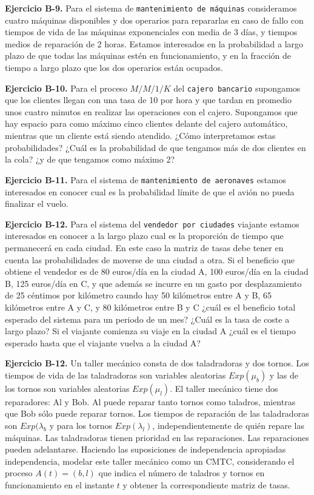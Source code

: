 \documentclass[
]{book}
\theoremstyle{definition}
\theoremstyle{definition}
\theoremstyle{definition}
\theoremstyle{definition}
\theoremstyle{remark}
\begin{document}
\textbf{Ejercicio B-9.} Para el sistema de \texttt{mantenimiento\ de\ máquinas} consideramos cuatro máquinas disponibles y dos operarios para repararlas en caso de fallo con tiempos de vida de las máquinas exponenciales con media de 3 días, y tiempos medios de reparación de 2 horas. Estamos interesados en la probabilidad a largo plazo de que todas las máquinas estén en funcionamiento, y en la fracción de tiempo a largo plazo que los dos operarios están ocupados.

\textbf{Ejercicio B-10.} Para el proceso \(M/M/1/K\) del \texttt{cajero\ bancario} supongamos que los clientes llegan con una tasa de 10 por hora y que tardan en promedio unos cuatro minutos en realizar las operaciones con el cajero. Supongamos que hay espacio para como máximo cinco clientes delante del cajero automático, mientras que un cliente está siendo atendido. ¿Cómo interpretamos estas probabilidades? ¿Cuál es la probabilidad de que tengamos más de dos clientes en la cola? ¿y de que tengamos como máximo 2?

\textbf{Ejercicio B-11.} Para el sistema de \texttt{mantenimiento\ de\ aeronaves} estamos interesados en conocer cual es la probabilidad límite de que el avión no pueda finalizar el vuelo.

\textbf{Ejercicio B-12.} Para el sistema del \texttt{vendedor\ por\ ciudades} viajante estamos interesados en conocer a la largo plazo cual es la proporción de tiempo que permanecerá en cada ciudad. En este caso la matriz de tasas debe tener en cuenta las probabilidades de moverse de una ciudad a otra. Si el beneficio que obtiene el vendedor es de 80 euros/día en la ciudad A, 100 euros/día en la ciudad B, 125 euros/día en C, y que además se incurre en un gasto por desplazamiento de 25 céntimos por kilómetro caundo hay 50 kilómetros entre A y B, 65 kilómetros entre A y C, y 80 kilómetros entre B y C ¿cuál es el beneficio total esperado del sistema para un periodo de un mes? ¿Cuál es la tasa de coste a largo plazo? Si el viajante comienza su viaje en la ciudad A ¿cuál es el tiempo esperado hasta que el viajante vuelva a la ciudad A?

\textbf{Ejercicio B-12.} Un taller mecánico consta de dos taladradoras y dos tornos. Los tiempos de vida de las taladradoras son variables aleatorias \(Exp(\mu_b)\) y las de los tornos son variables aleatorias \(Exp(\mu_l)\). El taller mecánico tiene dos reparadores: Al y Bob. Al puede reparar tanto tornos como taladros, mientras que Bob sólo puede reparar tornos. Los tiempos de reparación de las taladradoras son \(Exp(\lambda_b\) y para los tornos \(Exp(\lambda_l)\), independientemente de quién repare las máquinas. Las taladradoras tienen prioridad en las reparaciones. Las reparaciones pueden adelantarse. Haciendo las suposiciones de independencia apropiadas independencia, modelar este taller mecánico como un CMTC, considerando el proceso \(A(t) = (b, l)\) que indica el número de taladros y tornos en funcionamiento en el instante \(t\) y obtener la correspondiente matriz de tasas.
\end{document}
